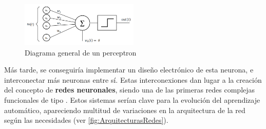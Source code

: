 \begin{figure}[H]
    \centering
    \includegraphics[width=0.5\textwidth]{images/4/perceptron.png}
    \caption{Diagrama general de un perceptron\cite{JgfisherPerceptronPerceptron}}
    \label{fig:Perceptron}
\end{figure}

Más tarde, se conseguiría implementar un diseño electrónico de esta neurona, e interconectar más neuronas entre sí. Estas interconexiones dan lugar a la creación del concepto de \textbf{redes neuronales}, 
siendo una de las primeras redes complejas funcionales de tipo . Estos sistemas serían clave para la evolución del aprendizaje automático, apareciendo multitud de 
variaciones en la arquitectura de la red según las necesidades (ver \autoref{fig:ArquitecturasRedes}).

